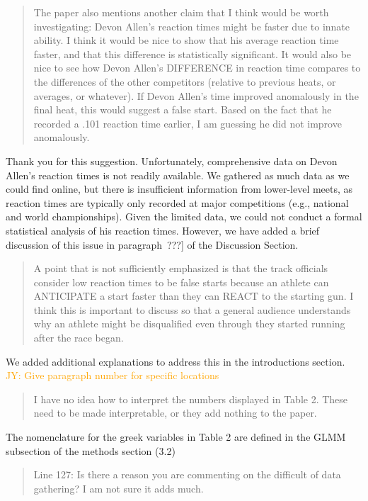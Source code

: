 \documentclass[12pt]{article}
\newcommand{\jy}[1]{\textcolor{orange}{JY: #1}}
\newenvironment{comment}%
{\begin{quotation}\noindent\small\it\color{darkblue}\ignorespaces%
}{\end{quotation}}
\begin{document}
\begin{comment}
The paper also mentions another claim that I think would be worth investigating:
Devon Allen’s reaction times might be faster due to innate ability. I think it
would be nice to show that his average reaction time faster, and that this
difference is statistically significant. It would also be nice to see how Devon
Allen’s DIFFERENCE in reaction time compares to the differences of the other
competitors (relative to previous heats, or averages, or whatever). If Devon
Allen’s time improved anomalously in the final heat, this would suggest a false
start. Based on the fact that he recorded a .101 reaction time earlier, I am
guessing he did not improve anomalously.  
\end{comment}

Thank you for this suggestion. Unfortunately, comprehensive data on
Devon Allen's reaction times is not readily available. We gathered as
much data as we could find online, but there is insufficient
information from lower-level meets, as reaction times are typically
only recorded at major competitions (e.g., national and world
championships). Given the limited data, we could not conduct a formal
statistical analysis of his reaction times. However, we have added a
brief discussion of this issue in paragraph~???] of the Discussion Section.


\begin{comment}
A point that is not sufficiently emphasized is that the track officials consider
low reaction times to be false starts because an athlete can ANTICIPATE a start
faster than they can REACT to the starting gun. I think this is important to
discuss so that a general audience understands why an athlete might be
disqualified even through they started running after the race began.  
\end{comment}

We added additional explanations to address this in the introductions section.
\jy{Give paragraph number for specific locations}

\begin{comment}
I have no idea how to interpret the numbers displayed in Table 2. These
need to be made interpretable, or they add nothing to the paper.
\end{comment}

The nomenclature for the greek variables in Table 2 are defined in the GLMM
subsection of the methods section (3.2)

\begin{comment}
Line 127: Is there a reason you are commenting on the difficult of data
gathering? I am not sure it adds much.
\end{comment}
\end{document}

